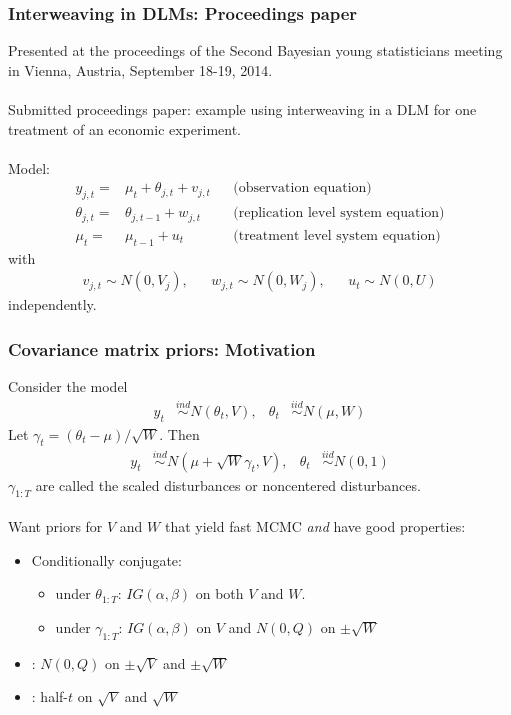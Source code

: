 \documentclass[xcolor=dvipsnames]{beamer}
\begin{document}
\begin{frame}
\frametitle{Interweaving in DLMs: Proceedings paper}

Presented at the proceedings of the Second Bayesian young statisticians meeting in Vienna, Austria, September 18-19, 2014.\\~\\

Submitted proceedings paper: example using interweaving in a DLM for one treatment of an economic experiment.\\~\\

\pause Model:
\begin{align*}
y_{j,t} =& \mu_t + \theta_{j,t} + v_{j,t}&&\mbox{(observation equation)} \nonumber\\
\theta_{j,t}=&\theta_{j,t-1} + w_{j,t}&&\mbox{(replication level system equation)}\nonumber\\
\mu_t=&\mu_{t-1} + u_t&&\mbox{(treatment level system equation)}
\end{align*}
with
\begin{align*}
v_{j,t}\sim N(0,V_j), && w_{j,t}\sim N(0,W_j), && u_t\sim N(0,U)
\end{align*}
independently.

\end{frame}




\begin{frame}
\frametitle{Covariance matrix priors: Motivation}
Consider the model
\begin{align*}
 y_t &\stackrel{ind}{\sim} N(\theta_t, V), &\theta_t &\stackrel{iid}{\sim} N(\mu,W)
\end{align*}
\pause
Let $\gamma_t=(\theta_t-\mu)/\sqrt{W}$. Then
\begin{align*}
 y_t &\stackrel{ind}{\sim} N(\mu + \sqrt{W}\gamma_t, V), & \theta_t &\stackrel{iid}{\sim} N(0,1)
\end{align*}
$\gamma_{1:T}$ are called the scaled disturbances or noncentered disturbances.\\~\\

\pause Want priors for $V$ and $W$ that yield fast MCMC {\it and} have good properties:
\begin{itemize}
\item Conditionally conjugate:
\begin{itemize}
\item under $\theta_{1:T}$: $IG(\alpha,\beta)$ on both $V$ and $W$.
\item under $\gamma_{1:T}$: $IG(\alpha,\beta)$  on $V$ and $N(0,Q)$ on $\pm\sqrt{W}$
\end{itemize}
\item \citet{fruhwirth2008bayesian}: $N(0,Q)$ on $\pm\sqrt{V}$ and $\pm\sqrt{W}$
\item \citet{gelman2006prior}: half-$t$ on $\sqrt{V}$ and $\sqrt{W}$
\end{itemize}
\end{frame}
\end{document}
